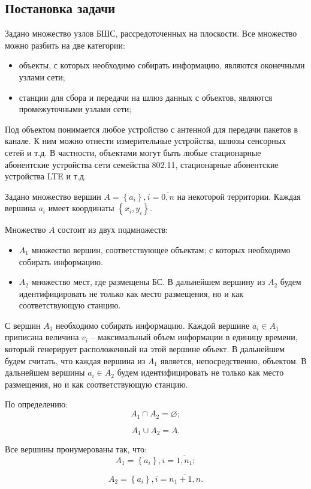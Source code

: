 \subsection{Постановка задачи}

Задано множество узлов БШС, рассредоточенных на плоскости. Все множество можно разбить на две категории:
\begin{itemize}
    \item объекты, с которых необходимо собирать информацию, являются оконечными узлами сети;
    \item станции для сбора и передачи на шлюз данных с объектов, являются промежуточными узлами сети; 
\end{itemize}
Под объектом понимается любое устройство с антенной для передачи пакетов в канале. К ним можно отнести измерительные устройства, шлюзы сенсорных сетей и т.д. В частности, объектами могут быть любые стационарные абонентские устройства сети семейства 802.11, стационарные абонентские устройства LTE и т.д.

Задано множество вершин $A= \left\{ a_i \right\}, i=\overline{0,n}$ на некоторой территории. Каждая вершина $a_i$ имеет координаты $\left\{ x_i, y_i \right\}$.

Множество $A$ состоит из двух подмножеств:
\begin{itemize}
    \item $A_1$ множество вершин, соответствующее объектам; с которых необходимо собирать информацию. 
    \item $A_2$ множество мест, где размещены БС. В дальнейшем вершину из $A_2$ будем идентифицировать  не только как место размещения, но и как соответствующую станцию.
\end{itemize}
С вершин $A_1$ необходимо собирать информацию. Каждой вершине $a_i \in A_1$ приписана величина $v_i$ -- максимальный объем информации в единицу времени, который генерирует расположенный на этой вершине объект.  В дальнейшем будем считать, что каждая вершина из $A_1$ является, непосредственно, объектом. В дальнейшем вершины  $a_i \in A_2$ будем идентифицировать не только как место размещения, но и как соответствующую станцию.

По определению:
$$
A_1 \cap A_2 = \varnothing;
$$

$$
A_1 \cup A_2 = A.
$$

Все вершины пронумерованы так, что:
$$
A_1 = \left\{a_i \right\}, i= \overline{1,n_1};
$$

$$
A_2 = \left\{ a_i  \right\}, i= \overline{n_1+1,n}.
$$

